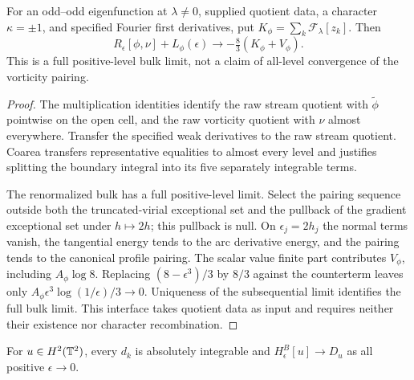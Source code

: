 \begin{lemma}
\label{lem:dd-character-virial-limit}
\leanok
For an odd--odd eigenfunction at $\lambda\ne0$, supplied quotient data,
a character $\kappa=\pm1$, and specified Fourier first derivatives, put
$K_\phi=\sum_k\mathcal F_\lambda[z_k]$. Then
\[
 R_\epsilon[\phi,\nu]+L_\phi(\epsilon)
 \longrightarrow-\tfrac83(K_\phi+V_\phi).
\]
This is a full positive-level bulk limit, not a claim of all-level
convergence of the vorticity pairing.
\end{lemma}

\begin{proof}
\leanok
The multiplication identities identify the raw stream quotient with
$\widetilde\phi$ pointwise on the open cell, and the raw vorticity
quotient with $\nu$ almost everywhere. Transfer the specified weak
derivatives to the raw stream quotient. Coarea transfers representative
equalities to almost every level and justifies splitting the boundary
integral into its five separately integrable terms.

The renormalized bulk has a full positive-level limit. Select the
pairing sequence outside both the truncated-virial exceptional set and
the pullback of the gradient exceptional set under $h\mapsto2h$;
this pullback is null. On $\epsilon_j=2h_j$ the normal terms vanish,
the tangential energy tends to the arc derivative energy, and the
pairing tends to the canonical profile pairing. The scalar value
finite part contributes $V_\phi$, including $A_\phi\log8$.
Replacing $(8-\epsilon^3)/3$ by $8/3$ against the counterterm leaves
only $A_\phi\epsilon^3\log(1/\epsilon)/3\to0$.
Uniqueness of the subsequential limit identifies the full bulk limit.
This interface takes quotient data as input and requires neither their
existence nor character recombination.
\end{proof}

\begin{lemma}
\label{lem:dd-boundaryB-trace-limit}
\leanok
For $u\in H^2(\mathbb{T}^2)$, every $d_k$ is absolutely integrable and
$H^B_\epsilon[u]\to D_u$ as all positive $\epsilon\to0$.
\end{lemma}

